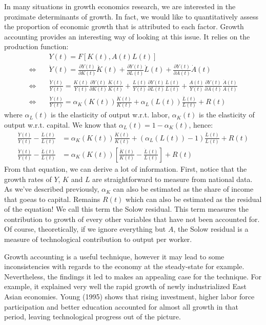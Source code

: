 \documentclass[12pt]{report}
\begin{document}
In many situations in growth economics research, we are interested in the proximate determinants of growth. In fact, we would like to quantitatively assess the proportion of economic growth that is attributed to each factor. Growth accounting provides an interesting way of looking at this issue. It relies on the production function: \begin{align*}
& Y(t) = F[K(t), A(t)L(t)] \\ \Leftrightarrow\quad & \dot{Y}(t) = \frac{\partial Y(t)}{\partial K(t)}\dot{K}(t) + \frac{\partial Y(t)}{\partial L(t)}\dot{L}(t) + \frac{\partial Y(t)}{\partial A(t)}\dot{A}(t) \\  \Leftrightarrow\quad & \frac{\dot{Y}(t)}{Y(t)} = \frac{K(t)}{Y(t)}\frac{\partial Y(t)}{\partial K(t)}\frac{\dot{K}(t)}{K(t)} + \frac{L(t)}{Y(t)}\frac{\partial Y(t)}{\partial L(t)}\frac{\dot{L}(t)}{L(t)} + \frac{A(t)}{Y(t)}\frac{\partial Y(t)}{\partial A(t)}\frac{\dot{A}(t)}{A(t)} \\ \Leftrightarrow\quad & \frac{\dot{Y}(t)}{Y(t)} = \alpha_K(K(t))\frac{\dot{K}(t)}{K(t)} + \alpha_L(L(t))\frac{\dot{L}(t)}{L(t)} + R(t)
\end{align*} where $\alpha_L(t)$ is the elasticity of output w.r.t. labor, $\alpha_K(t)$ is the elasticity of output w.r.t. capital. We know that $\alpha_L(t) = 1 - \alpha_K(t)$, hence: \begin{align*}
\frac{\dot{Y}(t)}{Y(t)} - \frac{\dot{L}(t)}{L(t)} & = \alpha_K(K(t))\frac{\dot{K}(t)}{K(t)} + (\alpha_L(L(t))-1)\frac{\dot{L}(t)}{L(t)} + R(t) \\ \frac{\dot{Y}(t)}{Y(t)} - \frac{\dot{L}(t)}{L(t)} & = \alpha_K(K(t))\left[\frac{\dot{K}(t)}{K(t)} - \frac{\dot{L}(t)}{L(t)}\right] + R(t)
\end{align*} From that equation, we can derive a lot of information. First, notice that the growth rates of $Y$, $K$ and $L$ are straightforward to measure from national data. As we've described previously, $\alpha_K$ can also be estimated as the share of income that goeas to capital. Remains $R(t)$ which can also be estimated as the residual of the equation! We call this term the Solow residual. This term measures the contribution to growth of every other variables that have not been accounted for. Of course, theoretically, if we ignore everything but $A$, the Solow residual is a measure of technological contribution to output per worker.

Growth accounting is a useful technique, however it may lead to some inconsistencies with regards to the economy at the steady-state for example. Nevertheless, the findings it led to makes an appealing case for the technique. For example, it explained very well the rapid growth of newly industrialized East Asian economies. Young (1995) shows that rising investment, higher labor force participation and better education accounted for almost all growth in that period, leaving technological progress out of the picture.
\end{document}
